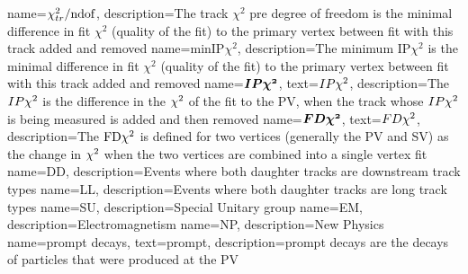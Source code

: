                  {
                   name=$\chi_{tr}^{2}/\rm{ndof}$,
                   description={The track $\chi^{2}$ pre degree of freedom is the minimal difference in fit $\chi^{2}$ (quality of the fit) to the primary vertex between fit with this track added  and removed} %
}
                 {
                   name=minIP$\chi^{2}$,
                   description={The minimum IP$\chi^{2}$ is the minimal difference in fit $\chi^{2}$ (quality of the fit) to the primary vertex between fit with this track added  and removed} %
}
                 {
                   name=$\mathbold{IP\chisq}$,
                   text=$IP\chi^2$,
                   description={The $IP\chi^2$ is the difference in the $\chi^2$ of the fit to the PV, when the track whose $IP\chi^2$ is being measured is added and then removed}
                 } 
                 {
                   name=$\mathbold{FD\chisq}$,
                   text=$FD\chi^2$,
                                    description={The $\mathrm{FD}\chi^2$ is defined for two vertices (generally the \Gls{PV} and \Gls{SV}) as the change in $\chi^2$ when the two vertices are combined into a single vertex fit}
                 }                
                 {
                   name=DD,
                   description={Events where both daughter tracks are downstream track types}
                 }
                 {
                   name=LL,
                   description={Events where both daughter tracks are long track types}
                 }
                 {
                   name=SU,
                   description={Special Unitary group}
                 }                 
                 {
                   name=EM,
                   description={Electromagnetism}
                 }                 
                 {
                   name=NP,
                   description={New Physics}
                 }
                 {
                   name=prompt decays,
                   text=prompt,
                   description={prompt decays are the decays of particles that were produced at the \Gls{PV}}
                 }
                 

